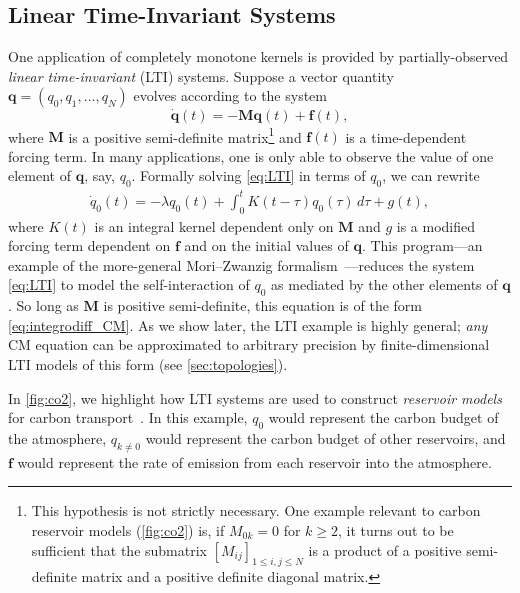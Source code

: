 \documentclass{cams-l} %
\theoremstyle{definition}
\theoremstyle{remark}
\numberwithin{equation}{section}
\begin{document}
\subsection{Linear Time-Invariant Systems}\label{sec:LTI}
One application of completely monotone kernels is provided by partially-observed \emph{linear time-invariant} (LTI) systems. Suppose a vector quantity $\mathbf{q}=(q_0,q_1,...,q_N)$ evolves according to the system
\begin{equation}\label{eq:LTI}
    \dot{\mathbf{q}}(t) = -\mathbf{M}\mathbf{q}(t) + \mathbf{f}(t),
\end{equation}
where $\mathbf{M}$ is a positive semi-definite matrix\footnote{This hypothesis is not strictly necessary. One example relevant to carbon reservoir models (\cref{fig:co2}) is, if $M_{0k} = 0$ for $k\geq 2$, it turns out to be sufficient that the submatrix $[M_{ij}]_{1\leq i,j\leq N}$ is a product of a positive semi-definite matrix and a positive definite diagonal matrix.%
} and $\mathbf{f}(t)$ is a time-dependent forcing term. In many applications, one is only able to observe the value of one element of $\mathbf{q}$, say, $q_0$. Formally solving \cref{eq:LTI} in terms of $q_0$, we can rewrite
\begin{align*}
    \dot{q}_0(t) = -\lambda q_0(t) + \int_0^t K(t-\tau)q_0(\tau)\,d\tau + g(t),
\end{align*}
where $K(t)$ is an integral kernel dependent only on $\mathbf{M}$ and $g$ is a modified forcing term dependent on $\mathbf{f}$ and on the initial values of $\mathbf{q}$. This program---an example of the more-general Mori--Zwanzig formalism~\cite{zwanzig2001nonequilibrium, givon2004extracting}---reduces the system \cref{eq:LTI} to model the self-interaction of $q_0$ as mediated by the other elements of $\mathbf{q}$. So long as $\mathbf{M}$ is positive semi-definite, this equation is of the form \ref{eq:integrodiff_CM}. As we show later, the LTI example is highly general; \emph{any} CM equation can be approximated to arbitrary precision by finite-dimensional LTI models of this form (see \cref{sec:topologies}).

In \cref{fig:co2}, we highlight how LTI systems are used to construct \emph{reservoir models} for carbon transport~\cite{Keeling1973}. In this example, $q_0$ would represent the carbon budget of the atmosphere, $q_{k\neq 0}$ would represent the carbon budget of other reservoirs, and $\mathbf{f}$ would represent the rate of emission from each reservoir into the atmosphere. 
\end{document}
